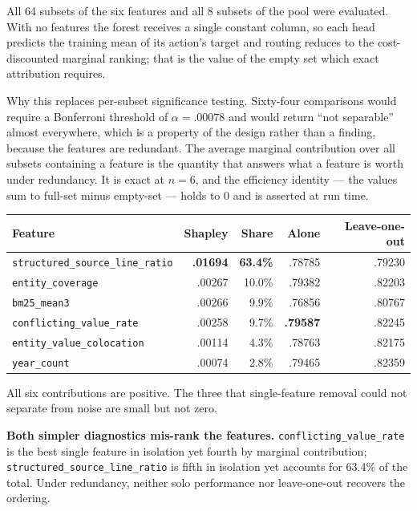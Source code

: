 \documentclass[10pt,a4paper]{article}
\newcommand{\fix}[1]{\textcolor{red!65!black}{#1}}
\begin{document}
All 64 subsets of the six features and all 8 subsets of the pool were evaluated. With no features
the forest receives a single constant column, so each head predicts the training mean of its
action's target and routing reduces to the cost-discounted marginal ranking; that is the value of
the empty set which exact attribution requires.

\fix{Why this replaces per-subset significance testing.} Sixty-four comparisons would require a
Bonferroni threshold of $\alpha=.00078$ and would return ``not separable'' almost everywhere,
which is a property of the design rather than a finding, because the features are redundant. The
average marginal contribution over all subsets containing a feature is the quantity that answers
what a feature is worth under redundancy. It is exact at $n=6$, and the efficiency identity ---
the values sum to full-set minus empty-set --- holds to $0$ and is asserted at run time.

\begin{center}\small
\begin{tabular}{lrrrr}
\toprule
Feature & Shapley & Share & Alone & Leave-one-out \\
\midrule
\texttt{structured\_source\_line\_ratio} & \textbf{.01694} & \textbf{63.4\%} & .78785 & .79230 \\
\texttt{entity\_coverage} & .00267 & 10.0\% & .79382 & .82203 \\
\texttt{bm25\_mean3} & .00266 & 9.9\% & .76856 & .80767 \\
\texttt{conflicting\_value\_rate} & .00258 & 9.7\% & \textbf{.79587} & .82245 \\
\texttt{entity\_value\_colocation} & .00114 & 4.3\% & .78763 & .82175 \\
\texttt{year\_count} & .00074 & 2.8\% & .79465 & .82359 \\
\bottomrule
\end{tabular}
\end{center}

All six contributions are positive. The three that single-feature removal could not separate from
noise are small but not zero.

\textbf{Both simpler diagnostics mis-rank the features.} \texttt{conflicting\_value\_rate} is the
best single feature in isolation yet fourth by marginal contribution;
\texttt{structured\_source\_line\_ratio} is fifth in isolation yet accounts for 63.4\% of the
total. Under redundancy, neither solo performance nor leave-one-out recovers the ordering.
\end{document}
